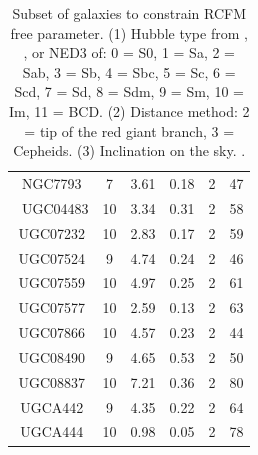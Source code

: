 \documentclass[reprint,%
 amsmath,amssymb,
 aps,
]{revtex4-1}
\begin{document}
\begin{table}[]
\begin{tabular}{|c|c|c|c|c|c|}
NGC7793& 	7& 	3.61& 	0.18&   	2& 	47\\\
UGC04483& 	10& 	3.34& 	0.31& 	2& 	58\\
UGC07232& 	10& 	2.83& 	0.17& 	2& 	59\\
UGC07524& 	9& 	4.74& 	0.24& 	    2& 	46\\
UGC07559& 	10& 	4.97& 	0.25& 	2& 	61\\
UGC07577& 	10& 	2.59& 	0.13& 	2& 	63\\
UGC07866& 	10& 	4.57& 	0.23& 	2& 	44\\
UGC08490& 	9& 	4.65& 	0.53&   	2& 	50\\
UGC08837& 	10& 	7.21& 	0.36& 	2& 	80\\
UGCA442& 	9& 	4.35& 	0.22& 	    2& 	64\\
UGCA444& 	10& 	0.98& 	0.05& 	2& 	78\\
    \hline \hline           
      \end{tabular}
      \caption{Subset of galaxies to constrain RCFM free parameter.  
      (1) Hubble type
      from \citet{1991rc3..book.....D}, \citet{schombert1992catalog}, or  NED3
of: 0 = S0, 1 = Sa, 2 = Sab,
3 = Sb, 4 = Sbc, 5 = Sc, 6 = Scd, 7 = Sd, 8 = Sdm,
9 = Sm, 10 = Im, 11 = BCD.  
(2) Distance method:  
2 = tip of the red giant branch, 3 = Cepheids.  (3) Inclination on the sky. \citet{2016Lelli}. } \label{tab:Tset}
  \end{table}
 
\end{document}
